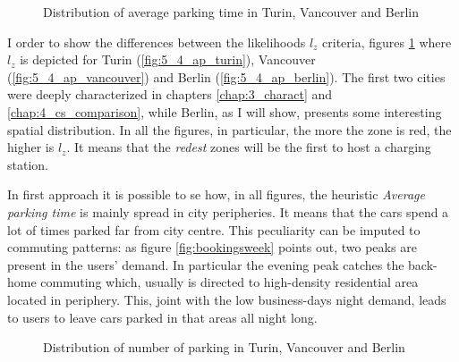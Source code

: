\begin{figure}[th]
	\centering     %
	\quad
	\quad
	\caption{Distribution of average parking time in Turin, Vancouver and Berlin}
	\label{fig:5_4_heatmap_avgparking}
\end{figure}

I order to show the differences between the likelihoods $l_z$ criteria, figures \ref{fig:5_4_heatmap_avgparking} where $l_z$ is depicted for Turin (\ref{fig:5_4_ap_turin}), Vancouver (\ref{fig:5_4_ap_vancouver}) and Berlin (\ref{fig:5_4_ap_berlin}). The first two cities were deeply characterized in chapters \ref{chap:3_charact} and \ref{chap:4_cs_comparison}, while Berlin, as I will show, presents some interesting spatial distribution. In all the figures, in particular, the more the zone is red, the higher is $l_z$. It means that the \emph{redest} zones will be the first to host a charging station.

In first approach it is possible to se how, in all figures, the heuristic \textit{Average parking time} is mainly spread in city peripheries. It means that the cars spend a lot of times parked far from city centre. This peculiarity can be imputed to commuting patterns: as figure \ref{fig:bookingsweek} points out, two peaks are present in the users' demand. In particular the evening peak catches the back-home commuting which, usually is directed to high-density residential area located in periphery. This, joint with the low business-days night demand, leads to users to leave cars parked in that areas all night long.


\begin{figure}[th]
	\centering     %
	\quad
	\quad
	\caption{Distribution of number of parking in Turin, Vancouver and Berlin}
	\label{fig:5_4_heatmap_numparking}
\end{figure}

